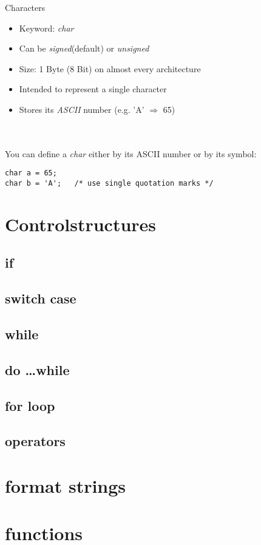 \documentclass[10pt,graphics,aspectratio=169,table]{beamer}
\begin{document}
\begin{frame}[fragile]{Characters}
	\begin{itemize}
		\item Keyword: \textit{char}
		\item Can be \textit{signed}(default) or \textit{unsigned}	
		\item Size: 1 Byte (8 Bit) on almost every architecture
		\item Intended to represent a single character
		\item Stores its \textit{ASCII} number (e.g. 'A' $\Rightarrow$ 65)
	\end{itemize}\ \\
	\ \\
	You can define a \textit{char} either by its ASCII number or by its symbol:
	\begin{lstlisting}[numbers=none]
char a = 65;
char b = 'A';	/* use single quotation marks */
\end{lstlisting}
\end{frame}


\section{Controlstructures}

\subsection{if}

\subsection{switch case}

\subsection{while}

\subsection{do \ldots while}

\subsection{for loop}

\subsection{operators}

\section{format strings}

\section{functions}
\end{document}

